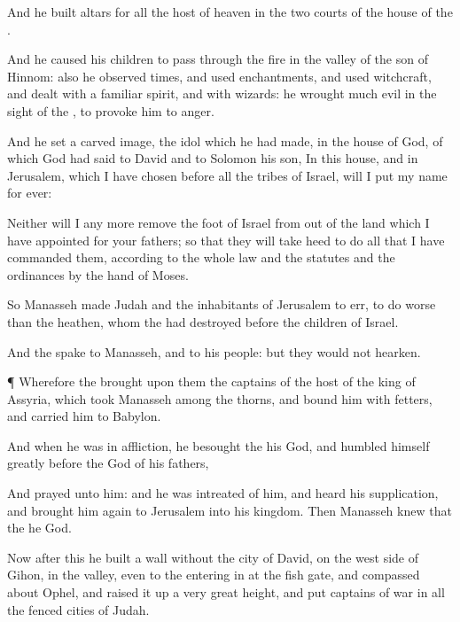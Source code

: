 {And he
built
altars for all the
host of
heaven in the
two
courts of the
house of the
{}.

And he
caused his
children to pass
through the
fire in the
valley of the
son of
Hinnom: also he observed
times, and used
enchantments, and used
witchcraft, and
dealt with a familiar
spirit, and with
wizards: he
wrought
much
evil in the
sight of the
{}, to provoke him to
anger.

And he
set a carved
image, the
idol which he had
made, in the
house of
God, of which
God had
said to
David and to
Solomon his
son, In this
house, and in
Jerusalem, which I have
chosen before all the
tribes of
Israel, will I
put my
name for
ever:

Neither will I any
more
remove the
foot of
Israel from
out of the
land which I have
appointed for your
fathers; so
that they will take
heed to
do all that I have
commanded them, according to the whole
law and the
statutes and the
ordinances by the
hand of
Moses.

So
Manasseh
made
Judah and the
inhabitants of
Jerusalem to
err,
{} to
do
worse than the
heathen, whom the
{} had
destroyed
before the
children of
Israel.

And the
{}
spake to
Manasseh, and to his
people: but they would not
hearken.


\par }{\PP {}¶ Wherefore the
{}
brought upon them the captains
of the host
of the
king of
Assyria, which
took
Manasseh among the
thorns, and bound
him with
fetters, and
carried him to
Babylon.

And when he was in
affliction, he
besought the
{} his
God, and
humbled himself
greatly
before the
God of his
fathers,

And
prayed unto him: and he was
intreated of him, and
heard his
supplication, and brought him
again to
Jerusalem into his
kingdom. Then
Manasseh
knew that the
{} he
{}
God.

Now after
this he
built a
wall
without the
city of
David, on the west
side of
Gihon, in the
valley, even to the entering
in at the
fish
gate, and
compassed about
Ophel, and raised it
up a very great
height, and
put
captains of
war in all the
fenced
cities of
Judah.

}
